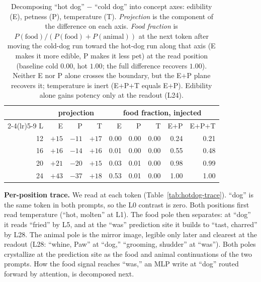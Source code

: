 \documentclass[11pt]{article}
\begin{document}
\begin{table}[htbp]
\centering
\small
\begin{tabular}{@{}r rrr rrrrr@{}}
\toprule
 & \multicolumn{3}{c}{projection} & \multicolumn{5}{c}{food fraction, injected} \\
\cmidrule(lr){2-4}\cmidrule(lr){5-9}
L & E & P & T & E & P & T & E$+$P & E$+$P$+$T \\
\midrule
12 & $+15$ & $-11$ & $+17$ & 0.00 & 0.00 & 0.00 & 0.24 & 0.21 \\
16 & $+16$ & $-14$ & $+16$ & 0.01 & 0.00 & 0.00 & 0.55 & 0.48 \\
20 & $+21$ & $-20$ & $+15$ & 0.03 & 0.01 & 0.00 & 0.98 & 0.99 \\
24 & $+43$ & $-37$ & $+18$ & 0.53 & 0.01 & 0.00 & 1.00 & 1.00 \\
\bottomrule
\end{tabular}
\caption{Decomposing ``hot dog'' $-$ ``cold dog'' into concept axes: edibility
(E), petness (P), temperature (T). \emph{Projection} is the component of the
difference on each axis. \emph{Food fraction} is $P(\text{food})/(P(\text{food})
+ P(\text{animal}))$ at the next token after moving the cold-dog run toward the
hot-dog run along that axis (E makes it more edible, P makes it less pet) at the
read position (baseline cold $0.00$, hot $1.00$; the full difference recovers
$1.00$). Neither E nor P alone crosses the
boundary, but the E$+$P plane recovers it; temperature is inert (E$+$P$+$T
equals E$+$P). Edibility alone gains potency only at the readout (L24).}
\label{tab:axes}
\end{table}

\textbf{Per-position trace.} We read at each token
(Table~\ref{tab:hotdog-trace}). ``dog'' is the same token in both prompts, so
the L0 contrast is zero. Both positions first read temperature (``hot, molten''
at L1). The food pole then separates: at ``dog'' it reads ``fried'' by L5, and
at the ``was'' prediction site it builds to ``tast, charred'' by L28. The animal
pole is the mirror image, legible only later and clearest at the readout (L28:
``whine, Paw'' at ``dog,'' ``grooming, shudder'' at ``was''). Both poles
crystallize at the prediction site as the food and animal continuations of the
two prompts. How the food signal reaches ``was,'' an MLP write at ``dog'' routed
forward by attention, is decomposed next.
\end{document}
